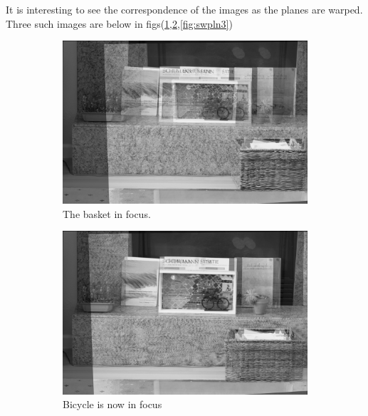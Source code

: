 \documentclass[a4paper]{article}
\begin{document}
It is interesting to see the correspondence of the images as the planes are warped.  Three such images are below in figs(\ref{fig:swpln1},\ref{fig:swpln2},\ref{fig:swpln3})

\begin{figure}
    \centering
    \begin{subfigure}[b]{0.3\textwidth}
        \includegraphics[width=\textwidth]{../Plane_Sweeping/Iwarp1.jpg}
        \caption{The basket in focus.}
        \label{fig:swpln1}
    \end{subfigure}
    \begin{subfigure}[b]{0.3\textwidth}
        \includegraphics[width=\textwidth]{../Plane_Sweeping/Iwarp11.jpg}
        \caption{Bicycle is now in focus}
        \label{fig:swpln2}
    \end{subfigure}
     \begin{subfigure}[b]{0.3\textwidth}

\end{subfigure}
\end{figure}
\end{document}

